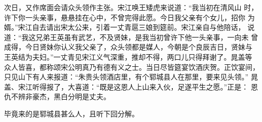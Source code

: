 次日，又作席面会请众头领作主张。宋江唤王矮虎来说道：“我当初在清风山
时，许下你一头亲事，悬悬挂在心中，不曾完得此愿。今日我父亲有个女儿，招你
为婿。”宋江自去请出宋太公来，引着一丈青扈三娘到筵前。宋江亲自与他陪话，
说道：“我这兄弟王英虽有武艺，不及贤妹，是我当初曾许下他一头亲事，一向未
曾成得，今日贤妹你认义我父亲了，众头领都是媒人，今朝是个良辰吉日，贤妹与
王英结为夫妇。”一丈青见宋江义气深重，推却不得，两口儿只得拜谢了。晁盖等
众人皆喜，都称颂宋公明真乃有德有义之士。当日尽皆筵宴饮酒庆贺。正饮宴间，
只见山下有人来报道：“朱贵头领酒店里，有个郓城县人在那里，要来见头领。”
晁盖、宋江听得报了，大喜道：“既是这恩人上山来入伙，足遂平生之愿。”正是：
恩仇不辨非豪杰，黑白分明是丈夫。

毕竟来的是郓城县甚么人，且听下回分解。